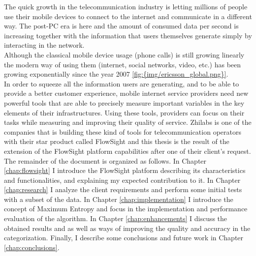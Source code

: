 
The quick growth in the telecommunication industry is letting millions of people use their mobile devices to connect to the internet and communicate in a different way. The post-PC era is here and
the amount of consumed data per second is increasing together with the information that users themselves generate simply by interacting in the network.\\
Although the classical mobile device usage (phone calls) is still growing linearly the modern way of using them (internet, social networks, video, etc.) has been growing exponentially since the year 
2007 \ref{fig:{img/ericsson_global.png}}.
 \\
In order to squeeze all the information users are generating, and to be able to provide a better customer experience, mobile internet service providers need new powerful tools that are able to precisely
measure important variables in the key elements of their infrastructures. Using these tools, providers can focus on their tasks while measuring and improving their quality of service.
Zhilabs is one of the companies that is building these kind of tools for telecommunication operators with their star product called FlowSight\cite{flowsight} and this thesis is the result of the 
extension of the FlowSight platform capabilities after one of their client's request.  \\ 
The remainder of the document is organized as follows. In Chapter \ref{chap:flowsight} I introduce the FlowSight platform describing its characteristics and functionalities, and explaining my
expected contribution to it. In Chapter \ref{chap:research} I analyze the client requirements and perform some initial tests with a subset of the data. In Chapter \ref{chap:implementation} I introduce
the concept of Maximum Entropy and focus in the implementation and performance evaluation of the algorithm. In Chapter \ref{chap:enhancements} I discuss the obtained results and as well as ways of 
improving the quality and accuracy in the categorization. Finally, I describe some conclusions and future work in Chapter \ref{chap:conclusions}.
